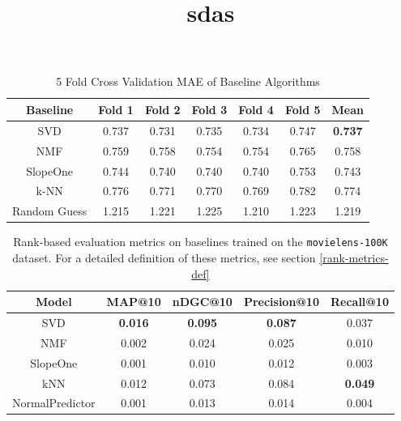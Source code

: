 \documentclass{article}
\begin{document}
\begin{table}[H]
    \centering
        \begin{tabular}{|c c c c c c c|} 
         \hline
         Baseline & Fold 1 & Fold 2 & Fold 3 & Fold 4 & Fold 5 & Mean \\ [0.5ex] 
         \hline\hline
         SVD & 0.737 & 0.731 & 0.735 & 0.734 & 0.747 & \bfseries 0.737 \\ 
         \hline
         NMF & 0.759 & 0.758 & 0.754 & 0.754 & 0.765 & 0.758 \\
         \hline
         SlopeOne & 0.744 & 0.740 & 0.740 & 0.740 & 0.753 & 0.743 \\
         \hline
         k-NN & 0.776 & 0.771 & 0.770 & 0.769 & 0.782 & 0.774 \\
         \hline
         Random Guess & 1.215 & 1.221 & 1.225 & 1.210 & 1.223 & 1.219 \\ [1ex] 
         \hline
        \end{tabular}
    \caption{5 Fold Cross Validation MAE of Baseline Algorithms}
    \label{tab:mae_results}
\end{table}

\begin{table}[H]
    \centering
        \begin{tabular}{|c c c c c|} 
         \hline
         Model & MAP@10 & nDGC@10 & Precision@10 & Recall@10 \\ [0.5ex] 
         \hline\hline
         SVD & \bfseries 0.016 & \bfseries 0.095 & \bfseries 0.087 & 0.037 \\
         \hline
         NMF & 0.002 & 0.024 & 0.025 & 0.010 \\ 
         \hline
         SlopeOne & 0.001 & 0.010 & 0.012 & 0.003 \\ 
         \hline
         kNN & 0.012 & 0.073 & 0.084 & \bfseries 0.049 \\ 
         \hline 
         NormalPredictor & 0.001 & 0.013 & 0.014 & 0.004 \\[1ex] 
         \hline
        \end{tabular}
    \title{sdas}
    \caption{Rank-based evaluation metrics on baselines trained on the \texttt{movielens-100K} dataset. For a detailed definition of these metrics, see section \ref{rank-metrics-def}}
    \label{tab:baseline-ranking-metrics}
\end{table}
\end{document}
